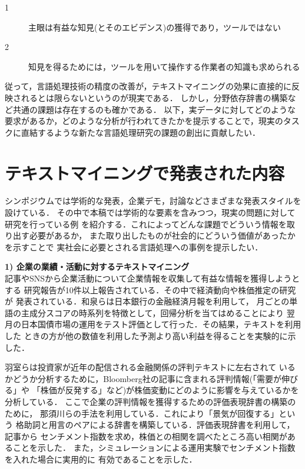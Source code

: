 \documentclass[twocolumn]{jarticle}
\begin{document}
\begin{description}
\item[1] 主眼は有益な知見(とそのエビデンス)の獲得であり，ツールではない
\item[2] 知見を得るためには，ツールを用いて操作する作業者の知識も求められる
\end{description}

従って，言語処理技術の精度の改善が，テキストマイニングの効果に直接的に反映されるとは限らないというのが現実である．
しかし，分野依存辞書の構築\cite{nasukawa04}など共通の課題は存在するのも確かである．
以下，実データに対してどのような要求があるか，どのような分析が行われてきたかを提示することで，現実のタスクに直結するような新たな言語処理研究の課題の創出に貢献したい．


\section{テキストマイニングで発表された内容}
シンポジウムでは学術的な発表，企業デモ，討論などさまざまな発表スタイルを設けている．
その中で本稿では学術的な要素を含みつつ，現実の問題に対して研究を行っている例
を紹介する．これによってどんな課題でどういう情報を取り出す必要があるか，
また取り出したものが社会的にどういう価値があったかを示すことで
実社会に必要とされる言語処理への事例を提示したい．

{\bf 1) 企業の業績・活動に対するテキストマイニング}\\
記事やSNSから企業活動について企業情報を収集して有益な情報を獲得しようとする
研究報告が10件以上報告されている．その中で経済動向や株価推定の研究が
発表されている．和泉ら\cite{izumi2011}は日本銀行の金融経済月報を利用して，
月ごとの単語の主成分スコアの時系列を特徴として，回帰分析を当てはめることにより
翌月の日本国債市場の運用をテスト評価として行った．その結果，テキストを利用した
ときの方が他の数値を利用した予測より高い利益を得ることを実験的に示した．

羽室ら\cite{hamuro2011}は投資家が近年の配信される金融関係の評判テキストに左右されて
いるかどうか分析するために，Bloomberg社の記事に含まれる評判情報(「需要が伸びる」や
「株価が反発する」など)が株価変動にどのように影響を与えているかを分析している．
ここで企業の評判情報を獲得するための評価表現辞書の構築のために，
那須川ら\cite{nasukawa04}の手法を利用している．これにより「景気が回復する」という
格助詞と用言のペアによる辞書を構築している．評価表現辞書を利用して，記事から
センチメント指数を求め，株価との相関を調べたところ高い相関があることを示した．
また，シミュレーションによる運用実験でセンチメント指数を入れた場合に実用的に
有効であることを示した．
\end{document}
